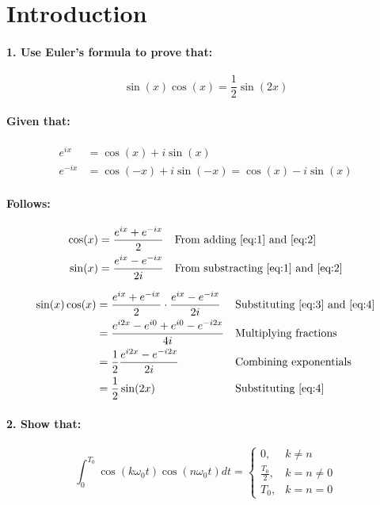 \section*{Introduction}
\paragraph{1. Use Euler's formula to prove that:}

\begin{equation}
	\sin(x) \cos(x) = \frac{1}{2} \sin(2x)
\end{equation}

\paragraph{Given that:}
\begin{align}
	e^{ix} &= \cos(x) + i \sin(x) \label{eq:1}\\
	e^{-ix} &= \cos(-x) + i \sin(-x) = \cos(x) - i \sin(x) \label{eq:2}
\end{align}

\paragraph{Follows:}
\begin{align*}
	\cos(x) &= \frac{e^{ix} + e^{-ix}}{2} & & \text{From adding \ref{eq:1} and \ref{eq:2}}\\
	 \sin(x) &= \frac{e^{ix} - e^{-ix}}{2i} & & \text{From substracting \ref{eq:1} and \ref{eq:2}} 
\end{align*}

\begin{align*}
	\sin(x) \cos(x) &= \frac{e^{ix} + e^{-ix}}{2} \cdot \frac{e^{ix} - e^{-ix}}{2i} & & \text{Substituting \ref{eq:3} and \ref{eq:4}}\\
	&= \frac{e^{i2x} - e^{i0} + e^{i0} - e^{-i2x}}{4i} & & \text{Multiplying fractions}\\
	&= \frac{1}{2} \frac{e^{i2x} - e^{-i2x}}{2i} & & \text{Combining exponentials}\\
	&= \frac{1}{2} \sin(2x) & & \text{Substituting \ref{eq:4}}
\end{align*}


\paragraph{2. Show that:}
\begin{equation}
	\int_0^{T_0} \cos(k \omega_0 t) \cos(n \omega_0 t) dt =
	\begin{cases}
		0,& k \neq n\\
		\frac{T_0}{2},& k = n \neq 0\\
		T_0,& k = n = 0
	\end{cases}
\end{equation}

